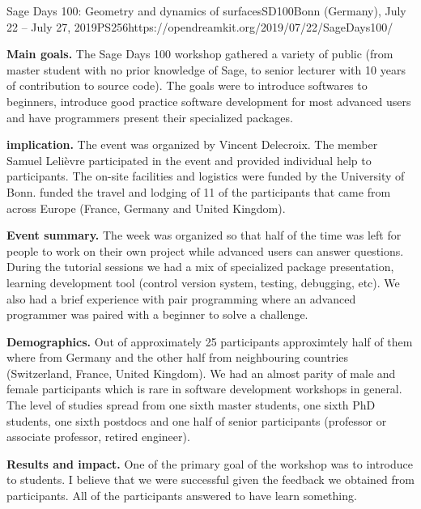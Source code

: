 \begin{event}{Sage Days 100: Geometry and dynamics of surfaces}{SD100}{Bonn (Germany), July 22 -- July 27, 2019}{PS}{25}{6}{https://opendreamkit.org/2019/07/22/SageDays100/}

\textbf{Main goals.} The Sage Days 100 workshop gathered a variety of public
(from master student with no prior knowledge
of Sage, to senior lecturer with 10 years of contribution to 
\Sage source code). The goals were to introduce \ODK softwares
to beginners, introduce good practice software development for
most advanced users and have programmers present their specialized
packages.

\textbf{\ODK implication.} The event was organized by Vincent Delecroix.
The \ODK member Samuel Leli\`evre participated in the event and
provided individual help to participants. The on-site facilities and
logistics were funded by the University of Bonn. \ODK funded the
travel and lodging of 11 of the participants that came from across
Europe (France, Germany and United Kingdom).

\textbf{Event summary.} The week was organized so that half of the
time was left for people to work on their own project while advanced
users can answer questions. During the tutorial sessions we had
a mix of specialized package presentation, learning development tool
(control version system, testing, debugging, etc). We also had a brief
experience with pair programming where an advanced programmer was
paired with a beginner to solve a challenge.


\textbf{Demographics.} Out of approximately 25 participants approximtely
half of them where from Germany and the other half from neighbouring
countries (Switzerland, France, United Kingdom). We had an almost parity
of male and female participants which is rare in software development
workshops in general. The level of studies spread from one sixth master students,
one sixth PhD students, one sixth postdocs and one half of senior participants
(professor or associate professor, retired engineer).


\textbf{Results and impact.} One of the primary goal of the workshop
was to introduce \Sage to students. I believe that we were successful
given the feedback we obtained from participants. All of the participants
answered to have learn something.

\end{event}
